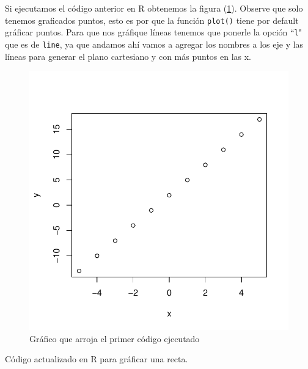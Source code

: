 \documentclass[12pt,a4paper]{article} %
\begin{document}
\newpage
Si ejecutamos el código anterior en R obtenemos la figura (\ref{fig:recta0}). Observe que solo tenemos graficados puntos, esto es por que la función \texttt{plot()} tiene por default gráficar puntos. Para que nos gráfique líneas tenemos que ponerle la opción ``\texttt{l}" que es de \texttt{line}, ya que andamos ahí vamos a agregar los nombres a los eje y las líneas para generar el plano cartesiano y con más puntos en las x.

\begin{figure}
\centering
\includegraphics[scale = 0.8]{recta0}
\caption{Gráfico que arroja el primer código ejecutado}
\label{fig:recta0}
\end{figure}

\begin{table}[htpb]
	
	\caption{Código actualizado en R para gráficar una recta.}
	\label{alg:recta1}
\end{table}
\end{document}
